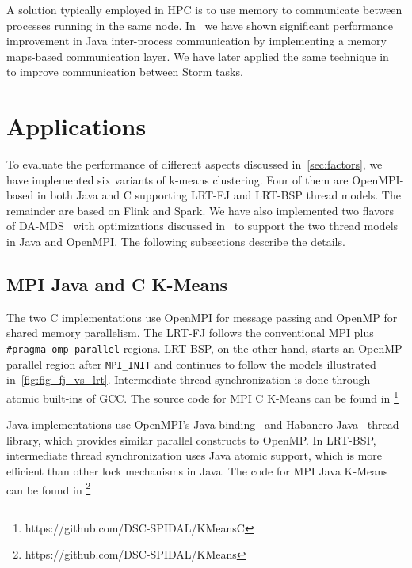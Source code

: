 \documentclass[10pt, conference, compsocconf]{IEEEtran}
\begin{document}
A solution typically employed in \ac{HPC} is to use memory to communicate between processes running in the same node. In~\cite{hpc2016:spidaljava} we have shown significant performance improvement in Java inter-process communication by implementing a memory maps-based communication layer. We have later applied the same technique in~\cite{kamburugamuve2016towards} to improve communication between Storm tasks.



\section{Applications} \label{sec:applications}
To evaluate the performance of different aspects discussed in~\ref{sec:factors}, we have implemented six variants of k-means clustering. Four of them are OpenMPI-based in both Java and C supporting \ac{LRT-FJ} and \ac{LRT-BSP} thread models. The remainder are based on Flink and Spark. We have also implemented two flavors of \ac{DA-MDS}~\cite{Ruan:2013:RSS:2547685.2547700} with optimizations discussed in~\cite{hpc2016:spidaljava} to support the two thread models in Java and OpenMPI. The following subsections describe the details.

\subsection{\ac{MPI} Java and C K-Means}
The two C implementations use OpenMPI for message passing and OpenMP for shared memory parallelism. The \ac{LRT-FJ} follows the conventional \ac{MPI} plus \texttt{\#pragma omp parallel} regions. \ac{LRT-BSP}, on the other hand, starts an OpenMP parallel region after \texttt{MPI\_INIT} and continues to follow the models illustrated in~\ref{fig:fig_fj_vs_lrt}. Intermediate thread synchronization is done through atomic built-ins of \ac{GCC}. The source code for MPI C K-Means can be found in \footnote{https://github.com/DSC-SPIDAL/KMeansC}

Java implementations use OpenMPI's Java binding~\cite{Vega-Gisbert:2013:TAJ:2488551.2488599,ompi-java-impl} and Habanero-Java~\cite{Imam:2014:HLJ:2647508.2647514} thread library, which provides similar parallel constructs to OpenMP. In \ac{LRT-BSP}, intermediate thread synchronization uses Java atomic support, which is more efficient than other lock mechanisms in Java. The code for MPI Java K-Means can be found in \footnote{https://github.com/DSC-SPIDAL/KMeans}
\end{document}

